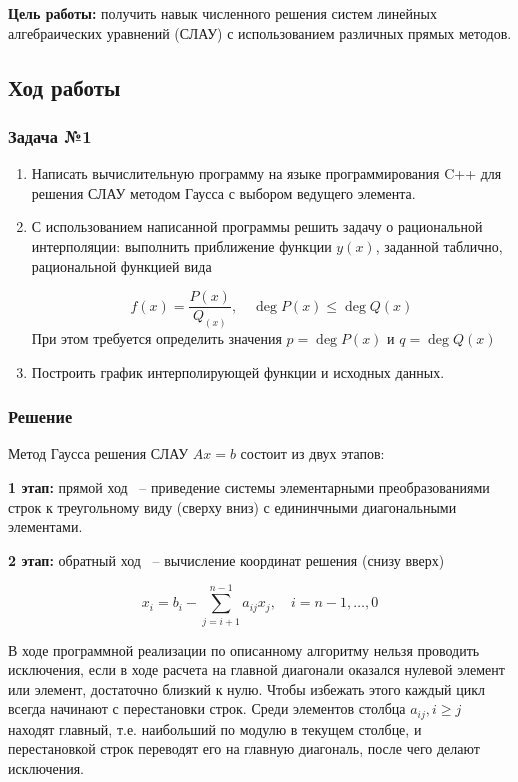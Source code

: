 \documentclass[a4paper, fontsize=14pt]{article}
\begin{document}

\textbf{Цель работы:} получить навык численного решения систем линейных алгебраических уравнений (СЛАУ) с использованием различных прямых методов.
\subsection*{{Ход работы}}
\subsubsection*{Задача №1}
\begin{enumerate}
    \item Написать вычислительную программу на языке программирования C++ для решения СЛАУ методом Гаусса с выбором ведущего элемента.
    \item С использованием написанной программы решить задачу о
          рациональной интерполяции: выполнить приближение функции $y(x)$,
          заданной таблично, рациональной функцией вида

          \begin{equation}
              \label{rational_interp}
              f(x) = \frac{P(x)}{Q_(x)}, \quad \operatorname{deg} P(x) \leq \operatorname{deg} Q(x)
          \end{equation}
          При этом требуется определить значения $p = \operatorname{deg} P(x)$ и $q = \operatorname{deg} Q(x)$
    \item Построить график интерполирующей функции и исходных данных.
\end{enumerate}
\subsubsection*{Решение}
Метод Гаусса решения СЛАУ $Ax = b$ состоит из двух этапов:

\textbf{1 этап: } прямой ход ~-- приведение системы элементарными преобразованиями строк к треугольному виду (сверху вниз) с едининчными диагональными элементами.

\textbf{2 этап: } обратный ход ~-- вычисление координат решения (снизу вверх)

\begin{equation*}
    x_i =b_i - \sum_{j = i+1}^{n-1} a_{ij} x_j, \quad i = n-1, \dots, 0
\end{equation*}

В ходе программной реализации по описанному алгоритму нельзя проводить исключения, если в ходе расчета на
главной диагонали оказался нулевой элемент или элемент, достаточно близкий к
нулю. Чтобы избежать этого каждый цикл всегда начинают с перестановки строк.
Среди элементов столбца $a_{ij}, i \geq j$ находят главный, т.е. наибольший по модулю
в текущем столбце, и перестановкой строк переводят его на главную диагональ,
после чего делают исключения.
\end{document}
